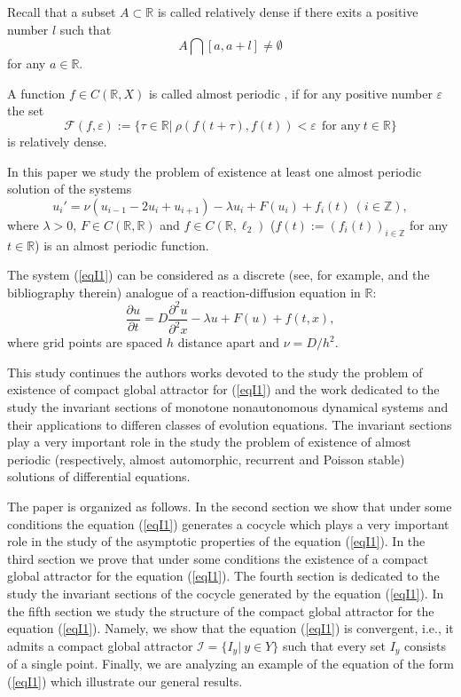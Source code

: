 \documentclass{amsart}%
\begin{document}
Recall that a subset $A\subset \mathbb R$ is called relatively
dense if there exits a positive number $l$ such that
\begin{equation}\label{eqRD1}
A\bigcap [a,a+l]\not= \emptyset
\end{equation}
for any $a\in \mathbb R$.

A function $f\in C(\mathbb R,X)$ is called almost periodic
\cite{Che_2020,Lev-Zhi}, if for any positive number $\varepsilon$
the set
\begin{equation}\label{eqRD2}
\mathcal F(f,\varepsilon):=\{\tau \in \mathbb R |\
\rho(f(t+\tau),f(t))<\varepsilon\ \ \mbox{for any}\ t\in \mathbb
R\}
\end{equation}
is relatively dense.

In this paper we study the problem of existence at least one
almost periodic solution of the systems
\begin{equation}\label{eqI1}
u_{i}'=\nu (u_{i-1}-2u_i+u_{i+1})-\lambda u_{i}+F(u_i)+f_{i}(t)\
(i\in \mathbb Z),
\end{equation}
where $\lambda >0$, $F\in C(\mathbb R, \mathbb R)$ and $f\in
C(\mathbb R,\ell_{2})$ ($f(t):=(f_{i}(t))_{i\in \mathbb Z}$ for
any $t\in \mathbb R$) is an almost periodic function.

The system (\ref{eqI1}) can be considered as a discrete (see, for
example, \cite{BLW_2001,HK_2023} and the bibliography therein)
analogue of a reaction-diffusion equation in $\mathbb R$:
\begin{equation}\label{eqI1.1}
 \frac{\partial{u}}{\partial{t}} = D\frac{\partial^{2}{u}}{\partial^{2}{x}}-\lambda u + F(u) +
 f(t,x),\nonumber
\end{equation}
where grid points are spaced $h$ distance apart and $\nu =
D/h^{2}$.

This study continues the authors works \cite{CS_2025} devoted to
the study the problem of existence of compact global attractor for
(\ref{eqI1}) and the work \cite{CS} dedicated to the study the
invariant sections of monotone nonautonomous dynamical systems and
their applications to differen classes of evolution equations. The
invariant sections play a very important role in the study the
problem of existence of almost periodic (respectively, almost
automorphic, recurrent and Poisson stable) solutions of
differential equations.

The paper is organized as follows. In the second section we show
that under some conditions the equation (\ref{eqI1}) generates a
cocycle which plays a very important role in the study of the
asymptotic properties of the equation (\ref{eqI1}). In the third
section we prove that under some conditions the existence of a
compact global attractor for the equation (\ref{eqI1}). The fourth
section is dedicated to the study the invariant sections of the
cocycle generated by the equation (\ref{eqI1}). In the fifth
section we study the structure of the compact global attractor for
the equation (\ref{eqI1}). Namely, we show that the equation
(\ref{eqI1}) is convergent, i.e., it admits a compact global
attractor $\mathcal I =\{I_{y}|\ y\in Y\}$ such that every set
$I_{y}$ consists of a single point. Finally, we are analyzing an
example of the equation of the form (\ref{eqI1}) which illustrate
our general results.
\end{document}

